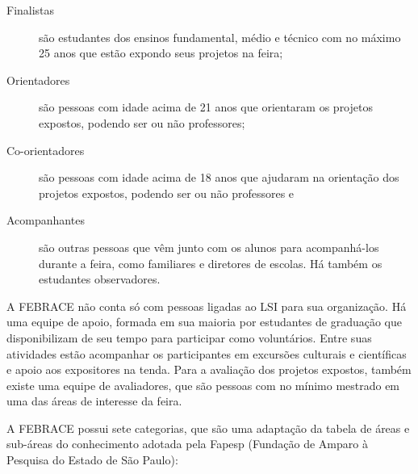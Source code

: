\begin{description}
    \item[Finalistas] 
        são estudantes dos ensinos fundamental, médio e técnico com no máximo 25 anos que estão expondo seus projetos na feira;
    \item[Orientadores] 
        são pessoas com idade acima de 21 anos que orientaram os projetos expostos, podendo ser ou não professores;
    \item[Co-orientadores] 
        são pessoas com idade acima de 18 anos que ajudaram na orientação dos projetos expostos, podendo ser ou não professores e
    \item[Acompanhantes] 
        são outras pessoas que vêm junto com os alunos para acompanhá-los durante a feira, como familiares e diretores de escolas. Há também os estudantes observadores.
\end{description}

A FEBRACE não conta só com pessoas ligadas ao LSI para sua organização. Há uma equipe de apoio, formada em sua maioria por estudantes de graduação que disponibilizam de seu tempo para participar como voluntários. Entre suas atividades estão acompanhar os participantes em excursões culturais e científicas e apoio aos expositores na tenda. Para a avaliação dos projetos expostos, também existe uma equipe de avaliadores, que são pessoas com no mínimo mestrado em uma das áreas de interesse da feira.

A FEBRACE possui sete categorias, que são uma adaptação da tabela de áreas e sub-áreas do conhecimento adotada pela Fapesp (Fundação de Amparo à Pesquisa do Estado de São Paulo):

